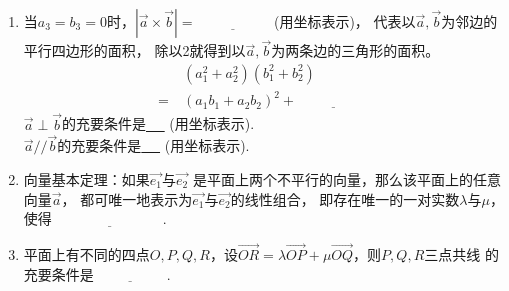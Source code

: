 \documentclass{article}
\newif\ifte
\renewcommand{\vec}{\overrightarrow}
\begin{document}
\begin{multicols}{2}
\begin{enumerate}[leftmargin=20pt]
\item 当$ a_3=b_3=0 $时，$ |\vec{a}\times\vec{b}|=
\underline{\ \ifte |a_1b_2-a_2b_1|\else \hspace{2cm} \fi\ } $
\ifte \else (用坐标表示)\fi，
代表以$ \vec{a},\vec{b} $为邻边的平行四边形的面积，
除以2就得到以$ \vec{a},\vec{b} $为两条边的三角形的面积。
\begin{align*}
    &\ (a_1^2+a_2^2)(b_1^2+b_2^2)\\
    =&\ (a_1b_1+a_2b_2)^2+\underline{\ \ifte 
        (a_1b_2-a_2b_1)^2 \else \hspace{2cm} \fi\ }
\end{align*}
$ \vec{a}\perp\vec{b} $的充要条件是\underline{\ \ifte 
    $ a_1b_1+a_2b_2=0 $\else \hspace{2.5cm} \fi\ }
\ifte \else (用坐标表示)\fi. \\
$ \vec{a}//\vec{b} $的充要条件是\underline{\ \ifte 
$ a_1b_2-a_2b_1=0 $\else \hspace{2.5cm} \fi\ }
\ifte \else (用坐标表示)\fi.

\item 向量基本定理：如果$ \vec{e_1} $与$ \vec{e_2} $
是平面上两个不平行的向量，那么该平面上的任意向量$ \vec{a} $，
都可唯一地表示为$ \vec{e_1} $与$ \vec{e_2} $的线性组合，
即存在唯一的一对实数$ \lambda $与$ \mu $，使得
$ \underline{\ \ifte \vec{a}=\lambda \vec{e_1}+
    \mu \vec{e_2}\else \hspace{3cm} \fi\ } $.

\item 平面上有不同的四点$ O,P,Q,R $，设$ \vec{OR}=
\lambda \vec{OP}+\mu \vec{OQ} $，则$ P,Q,R $三点共线
的充要条件是$ \underline{\ \ifte \lambda+\mu=1
 \else \hspace{2cm} \fi\ } $. 


\end{enumerate}
\end{multicols}
\end{document}
